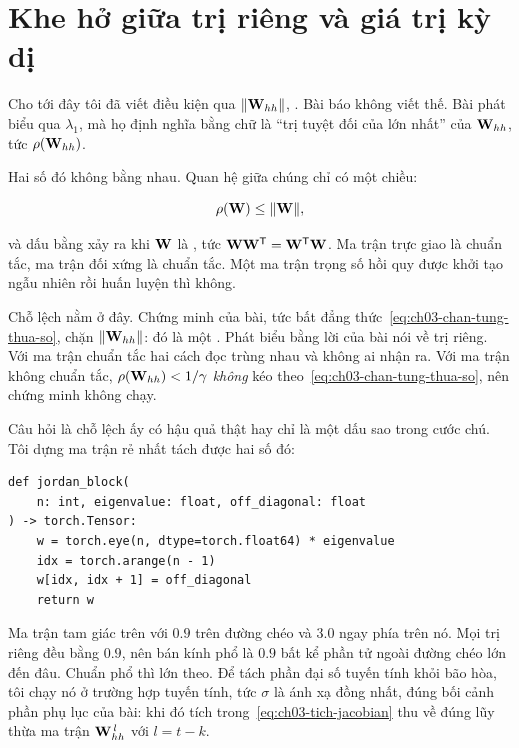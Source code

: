 \section{Khe hở giữa trị riêng và giá trị kỳ dị}
\label{sec:ch03-khe-ho}

%
Cho tới đây tôi đã viết điều kiện qua \(\lVert \mathbf{W}_{hh} \rVert\), . Bài
báo không viết thế. Bài phát biểu  qua \(\lambda_1\), mà họ định
nghĩa bằng chữ là \enquote{trị tuyệt đối của  lớn nhất} của
\(\mathbf{W}_{hh}\), tức  \(\rho(\mathbf{W}_{hh})\).

Hai số đó không bằng nhau. Quan hệ giữa chúng chỉ có một chiều:

\begin{equation}
  \rho(\mathbf{W}) \le \lVert \mathbf{W} \rVert,
  \label{eq:ch03-ro-nho-hon-chuan}
\end{equation}

và dấu bằng xảy ra khi \(\mathbf{W}\) là , tức
\(\mathbf{W}\mathbf{W}^{\mathsf{T}} = \mathbf{W}^{\mathsf{T}}\mathbf{W}\). Ma trận trực giao là
chuẩn tắc, ma trận đối xứng là chuẩn tắc. Một ma trận trọng số hồi quy được
khởi tạo ngẫu nhiên rồi huấn luyện thì không.

Chỗ lệch nằm ở đây. Chứng minh của bài, tức bất đẳng
thức~\eqref{eq:ch03-chan-tung-thua-so}, chặn \(\lVert \mathbf{W}_{hh} \rVert\): đó là một
. Phát biểu bằng lời của bài nói về trị riêng.
Với ma trận chuẩn tắc hai cách đọc trùng nhau và không ai nhận ra. Với ma trận
không chuẩn tắc, \(\rho(\mathbf{W}_{hh}) < 1/\gamma\) \emph{không} kéo
theo~\eqref{eq:ch03-chan-tung-thua-so}, nên chứng minh không chạy.

Câu hỏi là chỗ lệch ấy có hậu quả thật hay chỉ là một dấu sao trong cước chú.
Tôi dựng ma trận rẻ nhất tách được hai số đó:

\begin{verbatim}
def jordan_block(
    n: int, eigenvalue: float, off_diagonal: float
) -> torch.Tensor:
    w = torch.eye(n, dtype=torch.float64) * eigenvalue
    idx = torch.arange(n - 1)
    w[idx, idx + 1] = off_diagonal
    return w
\end{verbatim}

%
Ma trận tam giác trên với \(0.9\) trên đường chéo và \(3.0\) ngay phía trên nó.
Mọi trị riêng đều bằng \(0.9\), nên bán kính phổ là \(0.9\) bất kể phần tử ngoài
đường chéo lớn đến đâu. Chuẩn phổ thì lớn theo. Để tách phần đại số tuyến tính
khỏi bão hòa, tôi chạy nó ở trường hợp tuyến tính, tức \(\sigma\) là ánh xạ đồng
nhất, đúng bối cảnh phần phụ lục của bài: khi đó tích
trong~\eqref{eq:ch03-tich-jacobian} thu về đúng lũy thừa ma trận
\(\mathbf{W}_{hh}^{\,l}\) với \(l = t-k\).

